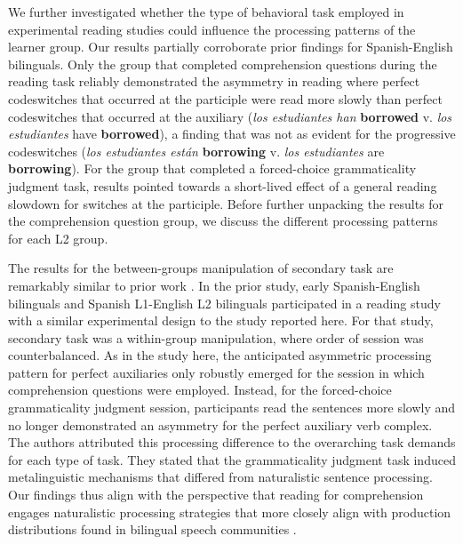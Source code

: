 \documentclass[output=paper,colorlinks,citecolor=brown]{langscibook}
\begin{document}
We further investigated whether the type of behavioral task employed in experimental reading studies could influence the processing patterns of the learner group. Our results partially corroborate prior findings for Spanish-English bilinguals. Only the group that completed comprehension questions during the reading task reliably demonstrated the asymmetry in reading where perfect codeswitches that occurred at the participle were read more slowly than perfect codeswitches that occurred at the auxiliary (\textit{los estudiantes han} \textbf{borrowed} v. \textit{los estudiantes} have \textbf{borrowed}), a finding that was not as evident for the progressive codeswitches (\textit{los estudiantes est\'an} \textbf{borrowing} v. \textit{los estudiantes} are \textbf{borrowing}). For the group that completed a forced-choice grammaticality judgment task, results pointed towards a short-lived effect of a general reading slowdown for switches at the participle. Before further unpacking the results for the comprehension question group, we discuss the different processing patterns for each L2 group.

The results for the between-groups manipulation of secondary task are remarkably similar to prior work \citep{ValdesKroffetal2018}. In the prior study, early Spanish-English bilinguals and Spanish L1-English L2 bilinguals participated in a reading study with a similar experimental design to the study reported here. For that study, secondary task was a within-group manipulation, where order of session was counterbalanced. As in the study here, the anticipated asymmetric processing pattern for perfect auxiliaries only robustly emerged for the session in which comprehension questions were employed. Instead, for the forced-choice grammaticality judgment session, participants read the sentences more slowly and no longer demonstrated an asymmetry for the perfect auxiliary verb complex. The authors attributed this processing difference to the overarching task demands for each type of task. They stated that the grammaticality judgment task induced metalinguistic mechanisms that differed from naturalistic sentence processing. Our findings thus align with the perspective that reading for comprehension engages naturalistic processing strategies that more closely align with production distributions found in bilingual speech communities \citep{MacizoBajo2006}.
\end{document}
